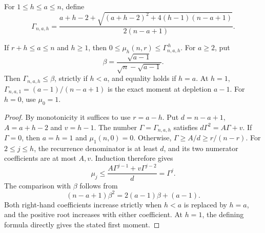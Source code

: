 For $1\le h\le a\le n$, define
\begin{equation}\label{eq:mixedgamma-def}
\Gamma_{n,a,h}=
\frac{a+h-2+\sqrt{(a+h-2)^2+4(h-1)(n-a+1)}}
{2(n-a+1)}.
\end{equation}
\begin{lemma}\label{lem:super}
If $r+h\le a\le n$ and $h\ge1$, then
$0\le\mu_h(n,r)\le\Gamma_{n,a,h}^{\,h}$.
For $a\ge2$, put
\[
\beta=\frac{\sqrt{a-1}}{\sqrt n-\sqrt{a-1}}.
\]
Then $\Gamma_{n,a,h}\le\beta$, strictly if $h<a$, and equality holds if $h=a$. At $h=1$, $\Gamma_{n,a,1}=(a-1)/(n-a+1)$ is the exact moment at depletion $a-1$. For $h=0$, use $\mu_0=1$.
\end{lemma}
\begin{proof}
By monotonicity it suffices to use $r=a-h$. Put
$d=n-a+1$, $A=a+h-2$ and $v=h-1$. The number $\Gamma=\Gamma_{n,a,h}$ satisfies
$d\Gamma^2=A\Gamma+v$. If $\Gamma=0$, then $a=h=1$ and $\mu_1(n,0)=0$. Otherwise,
$\Gamma\ge A/d\ge r/(n-r)$.
For $2\le j\le h$, the recurrence denominator is at least $d$, and its two numerator coefficients are at most $A,v$. Induction therefore gives
\[
\mu_j\le\frac{A\Gamma^{j-1}+v\Gamma^{j-2}}d=\Gamma^j.
\]
The comparison with $\beta$ follows from
\begin{equation}\label{eq:beta}
(n-a+1)\beta^2=2(a-1)\beta+(a-1).
\end{equation}
Both right-hand coefficients increase strictly when $h<a$ is replaced by $h=a$, and the positive root increases with either coefficient. At $h=1$, the defining formula directly gives the stated first moment.
\end{proof}


